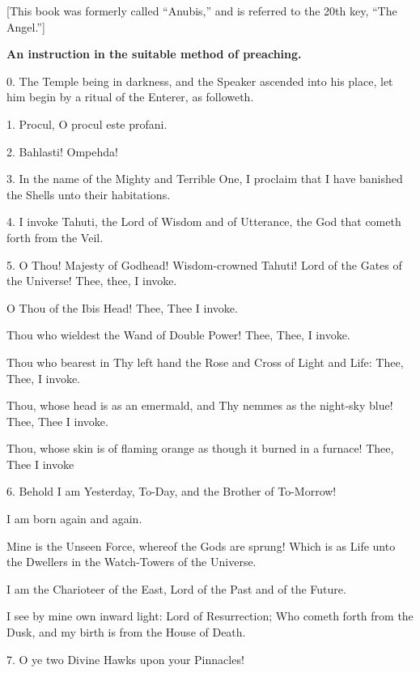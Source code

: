 
[This book was formerly called \enquote{Anubis,} and is referred to the 20th key, \enquote{The Angel.}]

\textbf{An instruction in the suitable method of preaching.}

0. The Temple being in darkness, and the Speaker ascended into his place, let him begin by a ritual of the Enterer, as followeth.

1.  Procul, O procul este profani.

2. Bahlasti! Ompehda!

3. In the name of the Mighty and Terrible One, I proclaim that I have banished the Shells unto their habitations.

4. I invoke Tahuti, the Lord of Wisdom and of Utterance, the God that cometh forth from the Veil.

5. O Thou! Majesty of Godhead! Wisdom-crowned Tahuti! Lord of the Gates of the Universe! Thee, thee, I invoke.

O Thou of the Ibis Head! Thee, Thee I invoke.

Thou who wieldest the Wand of Double Power! Thee, Thee, I invoke.

Thou who bearest in Thy left hand the Rose and Cross of Light and Life: Thee, Thee, I invoke.

Thou, whose head is as an emermald, and Thy nemmes as the night-sky blue! Thee, Thee I invoke.

Thou, whose skin is of flaming orange as though it burned in a furnace! Thee, Thee I invoke

6. Behold I am Yesterday, To-Day, and the Brother of To-Morrow!

I am born again and again.

Mine is the Unseen Force, whereof the Gods are sprung! Which is as Life unto the Dwellers in the Watch-Towers of the Universe.

I am the Charioteer of the East, Lord of the Past and of the Future.

I see by mine own inward light: Lord of Resurrection; Who cometh forth from the Dusk, and my birth is from the House of Death.

7. O ye two Divine Hawks upon your Pinnacles!

